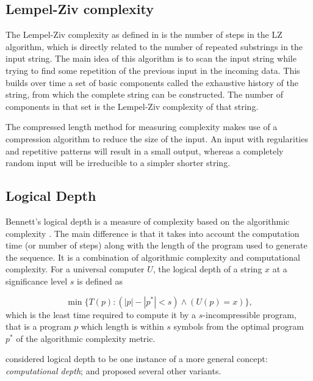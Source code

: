 \subsection{Lempel-Ziv complexity}\label{subsection:lempel-ziv}
The Lempel-Ziv complexity as defined in
\parencite{lempelComplexityFiniteSequences1976} is the number of steps in the LZ
algorithm, which is directly related to the number of repeated substrings in the
input string. The main idea of this algorithm is to scan the input string while
trying to find some repetition of the previous input in the incoming data. This
builds over time a set of basic components called the exhaustive history of the
string, from which the complete string can be constructed. The number of
components in that set is the Lempel-Ziv complexity of that string.

The compressed length method for measuring complexity makes use of a compression
algorithm to reduce the size of the input. An input with regularities and
repetitive patterns will result in a small output, whereas a completely random
input will be irreducible to a simpler shorter string.


\subsection{Logical Depth}

Bennett's logical depth is a measure of complexity based on the algorithmic
complexity \parencite{bennettDissipationInformationComputational1988,
  bennettLogicalDepthPhysical1995}. The main difference is that it takes into
account the computation time (or number of steps) along with the length of the
program used to generate the sequence. It is a combination of algorithmic
complexity and computational complexity. For a universal computer $U$, the
logical depth of a string $x$ at a significance level $s$ is defined as

\begin{equation}
  \label{eq:2}
  \min\{T(p): (|p| - |p^{*}| < s ) \wedge (U(p) = x) \},
\end{equation}
which is the least time required to compute it by a $s$-incompressible program,
that is a program $p$ which length is within $s$ symbols from the optimal program
$p^{*}$ of the algorithmic complexity metric.

\textcite{antunesComputationalDepthConcept2006} considered logical depth to be
one instance of a more general concept: \emph{computational depth}; and proposed
several other variants.

